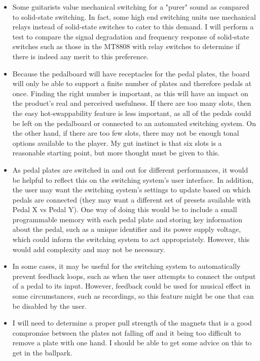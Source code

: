\documentclass{article}
\begin{document}
\begin{itemize}
    \item 
        Some guitarists value mechanical switching for a "purer" sound as compared to solid-state switching.  In fact, some high end switching units use mechanical relays instead of solid-state switches to cater to this demand.  I will perform a test to compare the signal degradation and frequency response of solid-state switches such as those in the MT8808 with relay switches to determine if there is indeed any merit to this preference.
    \item
        Because the pedalboard will have receptacles for the pedal plates, the board will only be able to support a finite number of plates and therefore pedals at once.  Finding the right number is important, as this will have an impact on the product's real and perceived usefulness.  If there are too many slots, then the easy hot-swappability feature is less important, as all of the pedals could be left on the pedalboard or connected to an automated switching system.  On the other hand, if there are too few slots, there may not be enough tonal options available to the player.  My gut instinct is that six slots is a reasonable starting point, but more thought must be given to this.
    \item
        As pedal plates are switched in and out for different performances, it would be helpful to reflect this on the switching system's user interface.  In addition, the user may want the switching system's settings to update based on which pedals are connected (they may want a different set of presets available with Pedal X vs Pedal Y).  One way of doing this would be to include a small programmable memory with each pedal plate and storing key information about the pedal, such as a unique identifier and its power supply voltage, which could inform the switching system to act appropriately.  However, this would add complexity and may not be necessary.
        
    \item
        In some cases, it may be useful for the switching system to automatically prevent feedback loops, such as when the user attempts to connect the output of a pedal to its input.  However, feedback could be used for musical effect in some circumstances, such as recordings, so this feature might be one that can be disabled by the user.
        
    \item
        I will need to determine a proper pull strength of the magnets that is a good compromise between the plates not falling off and it being too difficult to remove a plate with one hand.  I should be able to get some advice on this to get in the ballpark.
\end{itemize}
\end{document}
